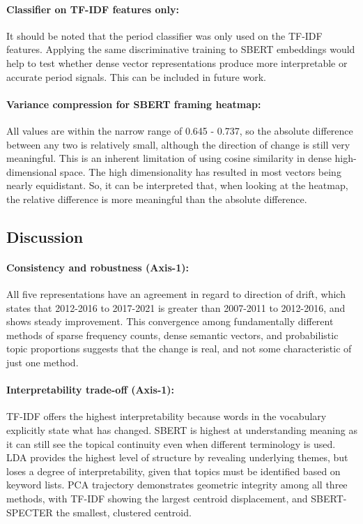 \documentclass[11pt]{article}
\begin{document}
\paragraph{Classifier on TF-IDF features only:}
It should be noted that the period classifier was only used on the TF-IDF features. Applying the same discriminative training to SBERT embeddings would help to test whether dense vector representations produce more interpretable or accurate period signals. This can be included in future work.

\paragraph{Variance compression for SBERT framing heatmap:}
All values are within the narrow range of 0.645 - 0.737, so the absolute difference between any two is relatively small, although the direction of change is still very meaningful. This is an inherent limitation of using cosine similarity in dense high-dimensional space. The high dimensionality has resulted in most vectors being nearly equidistant. So, it can be interpreted that, when looking at the heatmap, the relative difference is more meaningful than the absolute difference.

\subsection{Discussion}

\paragraph{Consistency and robustness (Axis-1):}
All five representations have an agreement in regard to direction of drift, which states that 2012-2016 to 2017-2021 is greater than 2007-2011 to 2012-2016, and shows steady improvement. This convergence among fundamentally different methods of sparse frequency counts, dense semantic vectors, and probabilistic topic proportions suggests that the change is real, and not some characteristic of just one method.

\paragraph{Interpretability trade-off (Axis-1):}
TF-IDF offers the highest interpretability because words in the vocabulary explicitly state what has changed. SBERT is highest at understanding meaning as it can still see the topical continuity even when different terminology is used. LDA provides the highest level of structure by revealing underlying themes, but loses a degree of interpretability, given that topics must be identified based on keyword lists. PCA trajectory demonstrates geometric integrity among all three methods, with TF-IDF showing the largest centroid displacement, and SBERT-SPECTER the smallest, clustered centroid.
\end{document}
